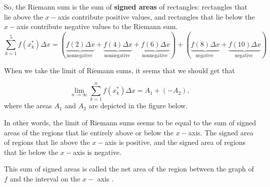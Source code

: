 \documentclass{ximera}
\begin{document}
\begin{example}
So, the Riemann sum is the sum of \textbf{signed areas} of rectangles: rectangles that lie above the $x-$axis contribute positive values, and rectangles that lie below the $x-$axis contribute negative values to the Riemann sum.
\[
\sum_{k=1}^5 f(x_k^*)\Delta x= \left(\underbrace{f(2)\Delta x}_{\text{nonnegative }}+  \underbrace{f(4)\Delta x}_{\text{nonnegative }}+  \underbrace{f(6)\Delta x}_{\text{nonnegative }}\right)+ \left(\underbrace{f(8)\Delta x}_{\text{negative }}+  \underbrace{f(10)\Delta x}_{\text{negative }}\right)
\]
 \end{example}

 When we take the limit of Riemann sums, it seems that we should get that
 
 \[
\lim_{n\to\infty}\sum_{k=1}^n f(x_k^*)\Delta x= A_1+(-A_2),
\]
where the areas $A_1$ and $A_2$ are depicted in the figure below. 

In other words, the limit of Riemann sums seems to be equal to the sum of signed areas of the regions that lie entirely above  or below  the $x-$axis.
The signed area of  regions that lie above the $x-$axis is positive, and the signed area of regions that lie below the $x-$axis is negative.

This sum of signed areas is called the net area of the region  between the graph of $f$ and the interval on the $x-$ axis .
 \begin{image}
\end{image}
\end{document}
